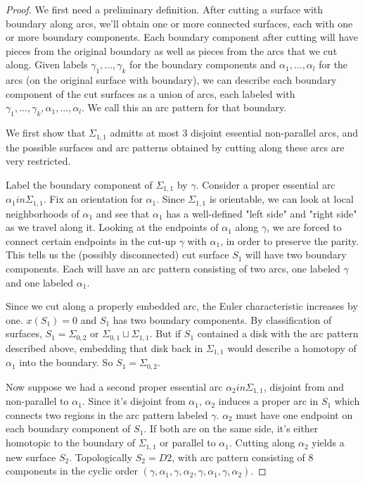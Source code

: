 \documentclass[12pt]{amsart}
\theoremstyle{definition}
\newcommand{\Si}{\Sigma}
\begin{document}
\begin{proof}

We first need a preliminary definition. After cutting a surface with boundary
along arcs, we'll obtain one or more connected surfaces, each with one or more
boundary components. Each boundary component after cutting will have pieces
from the original boundary as well as pieces from the arcs that we cut along.
Given labels $\gamma_1,...,\gamma_k$ for the boundary components and
$\alpha_1,...,\alpha_l$ for the arcs (on the original surface with boundary),
we can describe each boundary component of the cut surfaces as a union of arcs,
each labeled with $\gamma_1,...,\gamma_k,\alpha_1,...,\alpha_l$. We call this
an arc pattern for that boundary.

We first show that $\Si_{1,1}$ admitts at most 3 disjoint essential
non-parallel arcs, and the possible surfaces and arc patterns obtained by
cutting along these arcs are very restricted.

Label the boundary component of $\Si_{1,1}$ by $\gamma$. Consider a proper
essential arc $\alpha_1 in \Si_{1,1}$. Fix an orientation for $\alpha_1$. Since
$\Si_{1,1}$ is orientable, we can look at local neighborhoods of $\alpha_1$ and
see that $\alpha_1$ has a well-defined "left side" and "right side" as we
travel along it. Looking at the endpoints of $\alpha_1$ along $\gamma$, we are
forced to connect certain endpoints in the cut-up $\gamma$ with $\alpha_1$, in
order to preserve the parity. This tells us the (possibly disconnected) cut
surface $S_1$ will have two boundary components. Each will have an arc pattern
consisting of two arcs, one labeled $\gamma$ and one labeled $\alpha_1$.

Since we cut along a properly embedded arc, the Euler characteristic increases
by one. $x(S_1)=0$ and $S_1$ has two boundary components. By classification of
surfaces, $S_1 = \Si_{0,2}$ or $\Si_{0,1} \sqcup \Si_{1,1}$. But if $S_1$
contained a disk with the arc pattern described above, embedding that disk back
in $\Si_{1,1}$ would describe a homotopy of $\alpha_1$ into the boundary. So
$S_1 = \Si_{0,2}$.

Now suppose we had a second proper essential arc $\alpha_2 in \Si_{1,1}$,
disjoint from and non-parallel to $\alpha_1$. Since it's disjoint from
$\alpha_1$, $\alpha_2$ induces a proper arc in $S_1$ which connects two regions
in the arc pattern labeled $\gamma$.  $\alpha_2$ must have one endpoint on each
boundary component of $S_1$. If both are on the same side, it's either
homotopic to the boundary of $\Si_{1,1}$ or parallel to $\alpha_1$. Cutting
along $\alpha_2$ yields a new surface $S_2$. Topologically $S_2=D2$, with arc
pattern consisting of 8 components in the cyclic order
$(\gamma,\alpha_1,\gamma,\alpha_2,\gamma,\alpha_1,\gamma,\alpha_2)$.


\end{proof}
\end{document}
